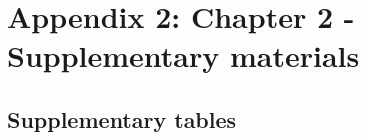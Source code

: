 \chapter[Appendix 2: Chapter 2 - Supplementary materials]{Appendix 2: Chapter 2
- Supplementary materials}\label{ch:Appendix2.1}

\renewcommand{\thefigure}{A.2.\arabic{figure}}
\setcounter{figure}{0}

\renewcommand{\thetable}{A.2.\arabic{table}}
\setcounter{table}{0}

\section*{Supplementary tables}

